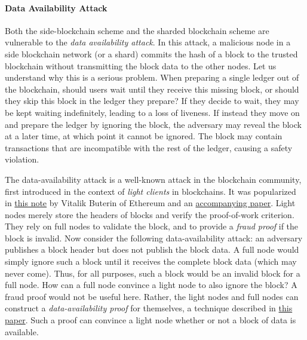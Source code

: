 \documentclass{article}
\begin{document}
\paragraph{Data Availability Attack}
Both the side-blockchain scheme and the sharded blockchain scheme are vulnerable to the \textit{data availability attack}. In this attack, a malicious node in a side blockchain network (or a shard) commits the hash of a block to the trusted blockchain without transmitting the block data to the other nodes. Let us understand why this is a serious problem. When preparing a single ledger out of the blockchain, should users wait until they receive this missing block, or should they skip this block in the ledger they prepare? If they decide to wait, they may be kept waiting indefinitely, leading to a loss of liveness. If instead they move on and prepare the ledger by ignoring the block, the adversary may reveal the block at a later time, at which point it cannot be ignored. The block may contain transactions that are incompatible with the rest of the ledger, causing a safety violation.

The data-availability attack is a well-known attack in the blockchain community, first introduced in the context of \textit{light clients} in blockchains. It was popularized in \href{https://github.com/ethereum/research/wiki/A-note-on-data-availability-and-erasure-coding}{this note} by Vitalik Buterin of Ethereum and an \href{https://arxiv.org/abs/1809.09044}{accompanying paper}. Light nodes merely store the headers of blocks and verify the proof-of-work criterion. They rely on full nodes to validate the block, and to provide a \textit{fraud proof} if the block is invalid. Now consider the following data-availability attack: an adversary publishes a block header but does not publish the block data. A full node would simply ignore such a block until it receives the complete block data (which may never come). Thus, for all purposes, such a block would be an invalid block for a full node. How can a full node convince a light node to also ignore the block? A fraud proof would not be useful here. Rather, the light nodes and full nodes can construct a \textit{data-availability proof} for themselves, a technique described in \href{https://arxiv.org/abs/1809.09044}{this paper}. Such a proof can convince a light node whether or not a block of data is available.
\end{document}
